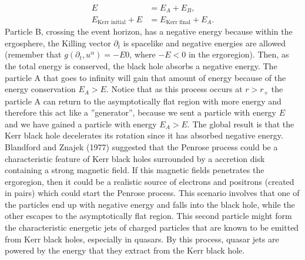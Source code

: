 \begin{align}
E&=E_A+E_B,\\
 E_\text{Kerr initial} + E&= E_\text{Kerr final}+E_A.
\end{align}
Particle B, crossing the event horizon, has a negative energy because within the ergosphere, the Killing vector $\partial_{\bar{t}}$ is spacelike and negative energies are allowed (remember that $g(\partial_t,u^\alpha)=-E0$, where $-E<0$ in the ergoregion). Then, as the total energy is conserved, the black hole absorbs a negative energy. The particle A that goes to infinity will gain that amount of energy because of the energy conservation $E_A>E$. Notice that as this process occurs at $r>r_+$ the particle A can return to the asymptotically flat region with more energy and therefore this act like a ''generator'', because we sent a particle with energy $E$ and we have gained a particle with energy $E_A>E$. The global result is that the Kerr black hole decelerates its rotation since it has absorbed negative energy. Blandford and Znajek (1977) suggested that the Penrose process could be a characteristic feature of Kerr black holes surrounded by a accretion disk containing a strong magnetic field. If this magnetic fields penetrates the ergoregion, then it could be a realistic source of electrons and positrons (created in pairs) which could start the Penrose process. This scenario involves that one of the particles end up with negative energy and falls into the black hole, while the other escapes to the asymptotically flat region. This second particle might form the characteristic energetic jets of charged particles that are known to be emitted from Kerr black holes, especially in quasars. By this process, quasar jets are powered by the energy that they extract from the Kerr black hole.


